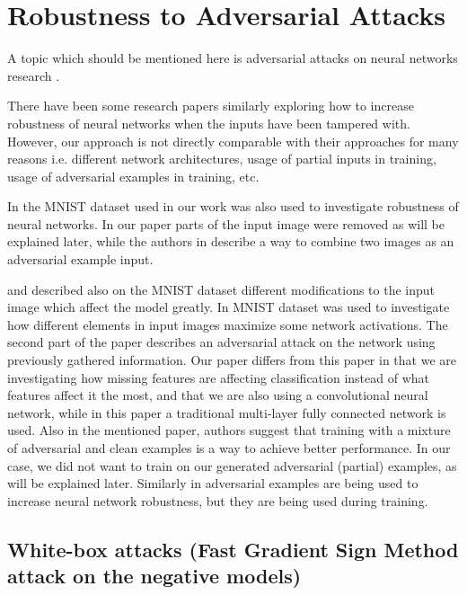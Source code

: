 \documentclass[b5paper]{book}
\let\cite\parencite
\begin{document}
\section{Robustness to Adversarial Attacks}
\label{sec:adversarial}

A topic which should be mentioned here is adversarial attacks on neural networks research \cite{bastani2016measuring}. 

There have been some research papers similarly exploring how to increase robustness of neural networks when the inputs have been tampered with. However, our approach is not directly comparable with their approaches for many reasons i.e. different network architectures, usage of partial inputs in training, usage of adversarial examples in training, etc.

In \cite{globerson2006nightmare} the MNIST \cite{lecun1998mnist} dataset used in our work was also used to investigate robustness of neural networks. In our paper parts of the input image were removed as will be explained later, while the authors in \cite{globerson2006nightmare} describe a way to combine two images as an adversarial example input.

\cite{szegedy2013intriguing} and \cite{goodfellowexplaining} described also on the MNIST dataset different modifications to the input image which affect the model greatly. In \cite{szegedy2013intriguing} MNIST dataset was used to investigate how different elements in input images maximize some network activations. The second part of the paper describes an adversarial attack on the network using previously gathered information. Our paper differs from this paper in that we are investigating how missing features are affecting classification instead of what features affect it the most, and that we are also using a convolutional neural network, while in this paper a traditional multi-layer fully connected network is used. Also in the mentioned paper, authors suggest that training with a mixture of adversarial and clean examples is a way to achieve better performance. In our case, we did not want to train on our generated adversarial (partial) examples, as will be explained later. Similarly in \cite{goodfellowexplaining} adversarial examples are being used to increase neural network robustness, but they are being used during training. 

\subsection{White-box attacks (Fast Gradient Sign Method attack on the negative models)}
\end{document}
